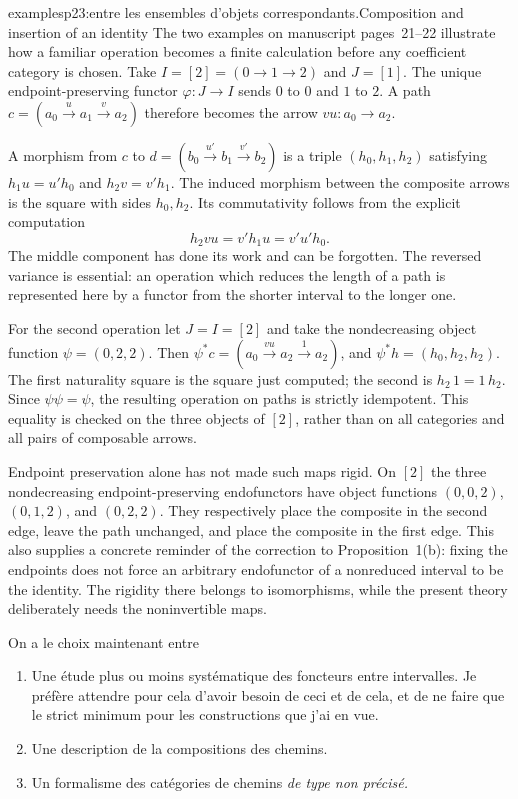 \begin{dcomment}{examples}{p23:entre les ensembles d'objets correspondants.}{Composition and insertion of an identity}
The two examples on manuscript pages~21--22 illustrate how a familiar operation becomes a finite calculation before any coefficient category is chosen. Take $I=[2]=(0\to1\to2)$ and $J=[1]$. The unique endpoint-preserving functor $\varphi:J\to I$ sends $0$ to $0$ and $1$ to $2$. A path $c=(a_0\xrightarrow{u}a_1\xrightarrow{v}a_2)$ therefore becomes the arrow $vu:a_0\to a_2$.

A morphism from $c$ to $d=(b_0\xrightarrow{u'}b_1\xrightarrow{v'}b_2)$ is a triple $(h_0,h_1,h_2)$ satisfying $h_1u=u'h_0$ and $h_2v=v'h_1$. The induced morphism between the composite arrows is the square with sides $h_0,h_2$. Its commutativity follows from the explicit computation
\[
 h_2vu=v'h_1u=v'u'h_0.
\]
The middle component has done its work and can be forgotten. The reversed variance is essential: an operation which reduces the length of a path is represented here by a functor from the shorter interval to the longer one.

For the second operation let $J=I=[2]$ and take the nondecreasing object function $\psi=(0,2,2)$. Then $\psi^*c=(a_0\xrightarrow{vu}a_2\xrightarrow{1}a_2)$, and $\psi^*h=(h_0,h_2,h_2)$. The first naturality square is the square just computed; the second is $h_2\,1=1\,h_2$. Since $\psi\psi=\psi$, the resulting operation on paths is strictly idempotent. This equality is checked on the three objects of $[2]$, rather than on all categories and all pairs of composable arrows.

Endpoint preservation alone has not made such maps rigid. On $[2]$ the three nondecreasing endpoint-preserving endofunctors have object functions $(0,0,2)$, $(0,1,2)$, and $(0,2,2)$. They respectively place the composite in the second edge, leave the path unchanged, and place the composite in the first edge. This also supplies a concrete reminder of the correction to Proposition~1(b): fixing the endpoints does not force an arbitrary endofunctor of a nonreduced interval to be the identity. The rigidity there belongs to isomorphisms, while the present theory deliberately needs the noninvertible maps.
\end{dcomment}


On a le choix maintenant entre

\begin{enumerate}[label=\alph*)]
\item Une étude plus ou moins systématique des foncteurs entre intervalles. Je préfère attendre pour cela d'avoir besoin de ceci et de cela, et de ne faire que le strict minimum pour les constructions que j'ai en vue.
\item Une description de la compositions des chemins. %
\item Un formalisme des catégories de chemins \textit{de type non précisé.}
\end{enumerate}

